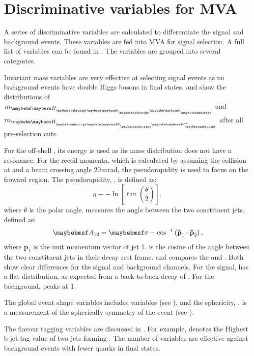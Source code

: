 \section{Discriminative variables for MVA}

A series of discriminative variables are calculated to differentiate the signal and background events. These variables are fed into MVA for signal selection. A full list of variables can be found in . The variables are grouped into several categories.

Invariant mass variables are very effective at selecting signal events as no background events have double Higgs bosons in final states.  and  show the distributions of $m_{\Hbb}$ and $m_{\HWW}$ after all pre-selection cuts.

For the off-shell \W*, its energy is used as its mass distribution does not have a resonance. For the recoil momenta, which is calculated by assuming the collision at \sqrtS and a beam crossing angle 20\,mrad, the pseudorapidity is used to focus on the froward region. The pseudorapidity, \eta, is defined as:
\begin{equation}
\eta \equiv  - \ln \left[ \tan \left( \frac{\theta}{2} \right) \right],
\end{equation}
where $\theta$ is the polar angle.  measures the angle between the two constituent jets, defined as:
\begin{equation}
\acolinearity{12} = \pi - \cos^{-1}\left(\textbf{\^{p}}_1\cdot\textbf{\^{p}}_2\right),
\end{equation}
where $\textbf{\^{p}}_1$ is the unit momentum vector of jet 1.  is the cosine of the angle between the two constituent jets in their decay rest frame.  and  compares the \acolinearity{\Hbb} and  \cosStar{\Hbb}. Both show clear differences for the signal and background channels.  For the signal, \cosStar{\Hbb} has a flat distribution, as expected from a back-to-back decay of \HepProcess{\PHiggs \to \Pbottom \APbottom}. For the background, \cosStar{\Hbb}  peaks at 1.

The global event shape variables includes \y{} variables (see \Section{}), and the sphericity,  \sphericity. \sphericity is a measurement of the spherically symmetry of the event (see \Section{}).

The flavour tagging variables are discussed in . For example,  denotes the Highest b-jet tag value of two jets forming \Hbb. The number of \PFOs variables are effective against background events with fewer quarks in final states.


